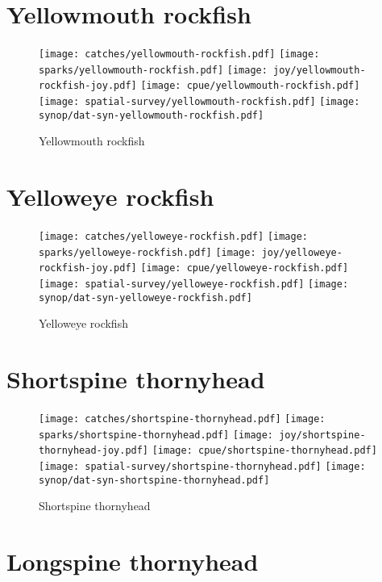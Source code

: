 \section*{Yellowmouth rockfish}

\begin{figure}[htbp]
\centering
\texttt{[image: catches/yellowmouth-rockfish.pdf]}
\texttt{[image: sparks/yellowmouth-rockfish.pdf]}
\texttt{[image: joy/yellowmouth-rockfish-joy.pdf]}
\texttt{[image: cpue/yellowmouth-rockfish.pdf]}
\texttt{[image: spatial-survey/yellowmouth-rockfish.pdf]}
\texttt{[image: synop/dat-syn-yellowmouth-rockfish.pdf]}
\caption{Yellowmouth rockfish}
\end{figure}
\clearpage
\section*{Yelloweye rockfish}

\begin{figure}[htbp]
\centering
\texttt{[image: catches/yelloweye-rockfish.pdf]}
\texttt{[image: sparks/yelloweye-rockfish.pdf]}
\texttt{[image: joy/yelloweye-rockfish-joy.pdf]}
\texttt{[image: cpue/yelloweye-rockfish.pdf]}
\texttt{[image: spatial-survey/yelloweye-rockfish.pdf]}
\texttt{[image: synop/dat-syn-yelloweye-rockfish.pdf]}
\caption{Yelloweye rockfish}
\end{figure}
\clearpage
\section*{Shortspine thornyhead}

\begin{figure}[htbp]
\centering
\texttt{[image: catches/shortspine-thornyhead.pdf]}
\texttt{[image: sparks/shortspine-thornyhead.pdf]}
\texttt{[image: joy/shortspine-thornyhead-joy.pdf]}
\texttt{[image: cpue/shortspine-thornyhead.pdf]}
\texttt{[image: spatial-survey/shortspine-thornyhead.pdf]}
\texttt{[image: synop/dat-syn-shortspine-thornyhead.pdf]}
\caption{Shortspine thornyhead}
\end{figure}
\clearpage
\section*{Longspine thornyhead}

